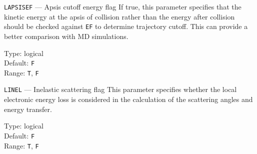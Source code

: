 \begin{keydescription}{\texttt{LAPSISEF} --- Apsis cutoff energy flag}
%
  If true, this parameter specifies that the kinetic energy at the apsis of 
  collision rather than the energy after collision should be checked against 
  \texttt{EF} to determine trajectory cutoff. This can provide a better
  comparison with MD simulations.
  \begin{keytab}
    Type:    \> logical \\
    Default: \> \texttt{F} \\
    Range:   \> \texttt{T}, \texttt{F}
  \end{keytab}
\end{keydescription}

\begin{keydescription}{\texttt{LINEL} --- Inelastic scattering flag}
%
  This parameter specifies whether the local electronic energy loss is
  considered in the calculation of the scattering angles and energy
  transfer.
  \begin{keytab}
    Type:    \> logical \\
    Default: \> \texttt{F} \\
    Range:   \> \texttt{T}, \texttt{F}
  \end{keytab}
\end{keydescription}

\iffalse
\begin{keydescription}{\texttt{LMD} --- Molecular dynamics flag}
%
  This parameter specifies whether a molecular dynamics or a binary 
  collision simulation is to be performed. For \texttt{LMD=T} there must
  be one crystalline and no other region. In this region there must be
  only one target atom species.
  \begin{keytab}
    Type:    \> logical \\
    Default: \> \texttt{F} \\
    Range:   \> \texttt{T}, \texttt{F}
  \end{keytab}
\end{keydescription}
\fi

\iffalse
\begin{keydescription}{\texttt{LMEHL} --- Gauss-Mehler quadrature flag}
%
  This parameter specifies whether the scattering angles and the time
  integral shall be calculated by Gauss-Mehler quadrature using the ZBL
  interatomic potential. For \texttt{LMEHL=F} the scattering angles and time 
  integrals are calculated by interpolation in the scattering table (see
  \texttt{SCATFILE}).
  \begin{keytab}
    Type:    \> logical \\
    Default: \> \texttt{F} \\
    Range:   \> \texttt{T}, \texttt{F}
  \end{keytab}
\end{keydescription}
\fi


